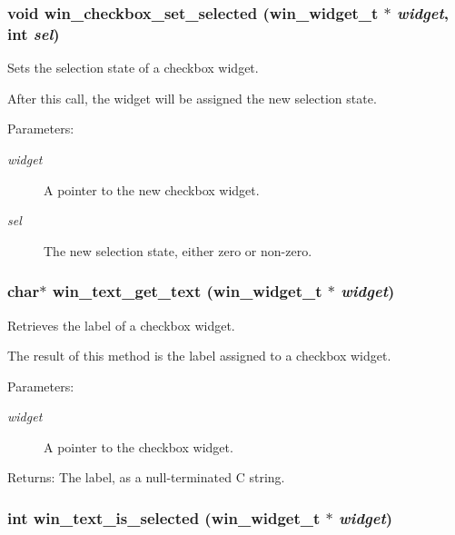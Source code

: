 \subsubsection{\setlength{\rightskip}{0pt plus 5cm}void win\_\-checkbox\_\-set\_\-selected ({\bf win\_\-widget\_\-t} $\ast$ {\em widget}, int {\em sel})}\label{wincheckbox_8h_a3}


Sets the selection state of a checkbox widget. 

After this call, the widget will be assigned the new selection state.

\begin{Desc}
\item[Parameters:]
\begin{description}
\item[{\em widget}]A pointer to the new checkbox widget. \item[{\em sel}]The new selection state, either zero or non-zero. \end{description}
\end{Desc}
\subsubsection{\setlength{\rightskip}{0pt plus 5cm}char$\ast$ win\_\-text\_\-get\_\-text ({\bf win\_\-widget\_\-t} $\ast$ {\em widget})}\label{wincheckbox_8h_a2}


Retrieves the label of a checkbox widget. 

The result of this method is the label assigned to a checkbox widget.

\begin{Desc}
\item[Parameters:]
\begin{description}
\item[{\em widget}]A pointer to the checkbox widget. \end{description}
\end{Desc}
\begin{Desc}
\item[Returns:]The label, as a null-terminated C string. \end{Desc}
\subsubsection{\setlength{\rightskip}{0pt plus 5cm}int win\_\-text\_\-is\_\-selected ({\bf win\_\-widget\_\-t} $\ast$ {\em widget})}\label{wincheckbox_8h_a4}


